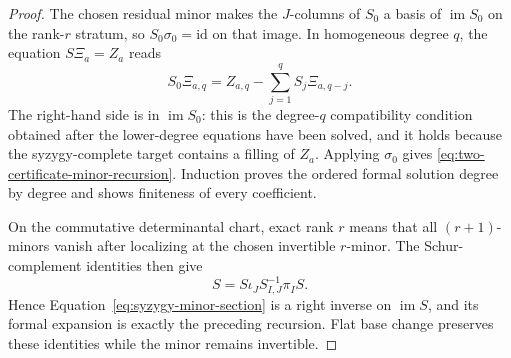 \documentclass[11pt]{article}
\theoremstyle{definition}
\begin{document}
\begin{proof}
The chosen residual minor makes the $J$-columns of $S_0$ a basis of
$\operatorname{im}S_0$ on the rank-$r$ stratum, so
$S_0\sigma_0=\mathrm{id}$ on that image.  In homogeneous degree $q$, the
equation $S\Xi_a=Z_a$ reads
\[
 S_0\Xi_{a,q}
 =Z_{a,q}-\sum_{j=1}^{q}S_j\Xi_{a,q-j}.
\]
The right-hand side is in $\operatorname{im}S_0$: this is the degree-$q$
compatibility condition obtained after the lower-degree equations have been
solved, and it holds because the syzygy-complete target contains a filling of
$Z_a$.  Applying $\sigma_0$ gives
\eqref{eq:two-certificate-minor-recursion}.  Induction proves the ordered
formal solution degree by degree and shows finiteness of every coefficient.

On the commutative determinantal chart, exact rank $r$ means that all
$(r+1)$-minors vanish after localizing at the chosen invertible $r$-minor.
The Schur-complement identities then give
\[
 S
 =S\iota_JS_{I,J}^{-1}\pi_I S.
\]
Hence Equation~\eqref{eq:syzygy-minor-section} is a right inverse on
$\operatorname{im}S$, and its formal expansion is exactly the preceding
recursion.  Flat base change preserves these identities while the minor
remains invertible.
\end{proof}
\end{document}
